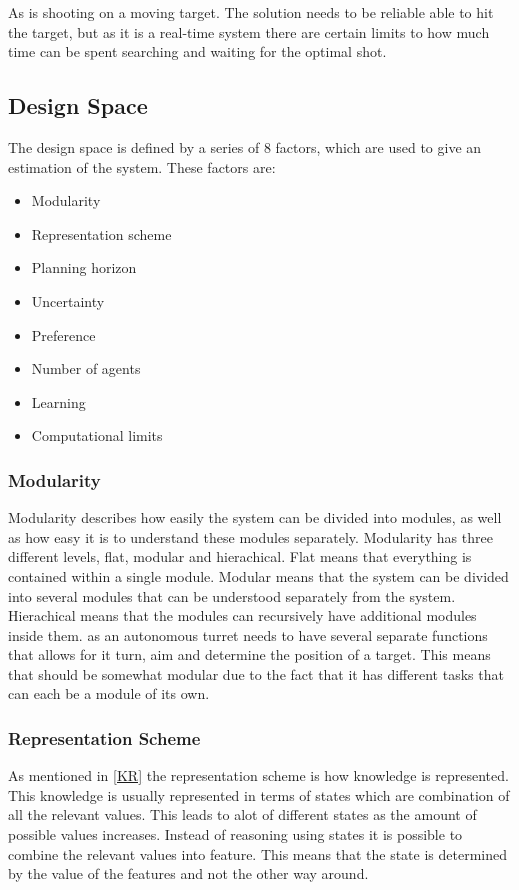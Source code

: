 As \name is shooting on a moving target. The solution needs to be reliable able
to hit the target, but as it is a real-time system there are certain limits to
how much time can be spent searching and waiting for the optimal shot.


\subsection{Design Space}
The design space is defined by a series of 8 factors, which are used to give an
estimation of the system. These factors are:

\begin{itemize}
   \item Modularity
   \item Representation scheme
   \item Planning horizon
   \item Uncertainty
   \item Preference
   \item Number of agents
   \item Learning
   \item Computational limits
\end{itemize}

\subsubsection{Modularity}
Modularity describes how easily the system can be divided into modules, as well
as how easy it is to understand these modules separately. Modularity has three
different levels, flat, modular and hierachical. Flat means that everything is
contained within a single module. Modular means that the system can be divided
into several modules that can be understood separately from the system.
Hierachical means that the modules can recursively have additional modules
inside them. \name as an autonomous turret needs to have several separate
functions that allows for it turn, aim and determine the position of a target.
This means that \name should be somewhat modular due to the fact that it has
different tasks that can each be a module of its own.

\subsubsection{Representation Scheme}
As mentioned in \autoref{KR} the representation scheme is how knowledge is
represented. This knowledge is usually represented in terms of states which are
combination of all the relevant values. This leads to alot of different states
as the amount of possible values increases. Instead of reasoning using states it
is possible to combine the relevant values into feature. This means that the
state is determined by the value of the features and not the other way around.

